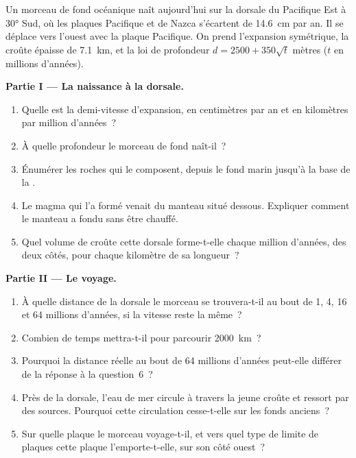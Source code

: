 \begin{problem}
\label{pb:g11:ocean-ridges:1}
Un morceau de fond océanique naît aujourd'hui sur la dorsale du Pacifique
Est à \ang{30} Sud, où les plaques Pacifique et de Nazca s'écartent de
\qty{14.6}{cm} par an. Il se déplace vers l'ouest avec la plaque Pacifique.
On prend l'expansion symétrique, la croûte épaisse de \qty{7.1}{km}, et la
loi de profondeur $d = 2500 + 350\sqrt{t}$ mètres ($t$ en millions
d'années).

\medskip
\noindent\textbf{Partie I --- La naissance à la dorsale.}
\begin{enumerate}
  \item Quelle est la demi-vitesse d'expansion, en centimètres par an et en
        kilomètres par million d'années~?
  \item À quelle profondeur le morceau de fond naît-il~?
  \item Énumérer les roches qui le composent, depuis le fond marin jusqu'à
        la base de la .
  \item Le magma qui l'a formé venait du manteau situé dessous. Expliquer
        comment le manteau a fondu sans être chauffé.
  \item Quel volume de croûte cette dorsale forme-t-elle chaque million
        d'années, des deux côtés, pour chaque kilomètre de sa longueur~?
\end{enumerate}

\medskip
\noindent\textbf{Partie II --- Le voyage.}
\begin{enumerate}[resume]
  \item À quelle distance de la dorsale le morceau se trouvera-t-il au bout
        de 1, 4, 16 et 64 millions d'années, si la vitesse reste la même~?
  \item Combien de temps mettra-t-il pour parcourir \qty{2000}{km}~?
  \item Pourquoi la distance réelle au bout de 64 millions d'années
        peut-elle différer de la réponse à la question~6~?
  \item Près de la dorsale, l'eau de mer circule à travers la jeune croûte
        et ressort par des sources. Pourquoi cette circulation cesse-t-elle
        sur les fonds anciens~?
  \item Sur quelle plaque le morceau voyage-t-il, et vers quel type de
        limite de plaques cette plaque l'emporte-t-elle, sur son côté
        ouest~?
\end{enumerate}


\end{problem}
